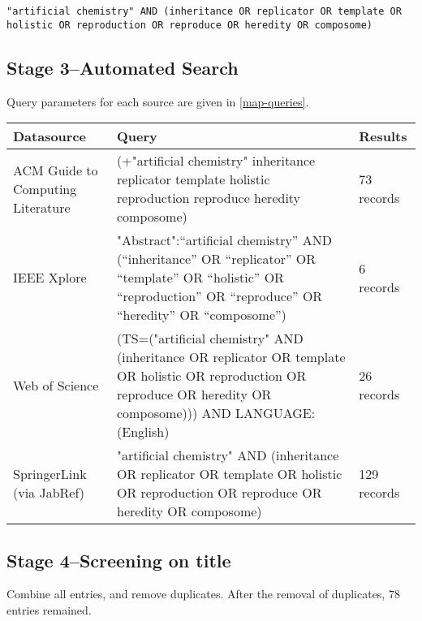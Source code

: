 \texttt{"artificial chemistry" AND (inheritance OR replicator OR template OR holistic OR reproduction OR reproduce OR heredity OR composome)}

\subsection{Stage 3--Automated Search}
Query parameters for each source are given in \cref{map-queries}.
\begin{table*}
\footnotesize
\begin{center}
\begin{tabular}{@{}lp{8cm}p{2cm}@{}}
\toprule
Datasource & Query & Results\\
\midrule
ACM Guide to Computing Literature & (+"artificial chemistry" inheritance replicator template holistic reproduction reproduce heredity composome)&73 records\\
\midrule
IEEE Xplore& "Abstract":“artificial chemistry” AND (“inheritance” OR “replicator” OR “template” OR “holistic” OR “reproduction” OR “reproduce” OR “heredity” OR “composome”)&6 records  \\
\midrule
Web of Science & (TS=("artificial chemistry" AND (inheritance OR replicator OR template OR holistic OR reproduction OR reproduce OR heredity OR composome))) AND LANGUAGE: (English)&26 records\\
\midrule
SpringerLink (via JabRef) &"artificial chemistry" AND (inheritance OR replicator OR template OR holistic OR reproduction OR reproduce OR heredity OR composome) & 129 records\\ 
\bottomrule
\end{tabular}
\end{center}
\caption{Query parameters for automated search. Searches were not restricted to any year range.}\label{map-queries}
\end{table*}

\subsection{Stage 4--Screening on title}

Combine all entries, and remove duplicates. After the removal of duplicates, 78 entries remained.

